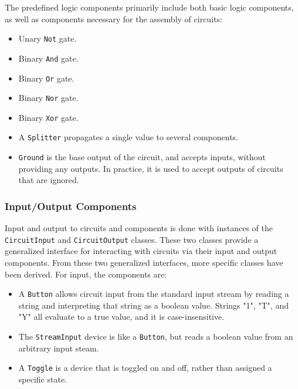 \documentclass{article}
\newcommand{\ClassName}[1]{\texttt{#1}}
\begin{document}
The predefined logic components primarily include both basic logic components, as well as components necessary for the assembly of circuits:

\begin{itemize}

\item Unary \ClassName{Not} gate.

\item Binary \ClassName{And} gate.

\item Binary \ClassName{Or} gate.

\item Binary \ClassName{Nor} gate.

\item Binary \ClassName{Xor} gate.

\item A \ClassName{Splitter} propagates a single value to several components.

\item \ClassName{Ground} is the base output of the circuit, and accepts inputs, without providing any outputs. In practice, it is used to accept outputs of circuits that are ignored.

\end{itemize}

\subsubsection{Input/Output Components}

Input and output to circuits and components is done with instances of the \ClassName{CircuitInput} and \ClassName{CircuitOutput} classes. These two classes provide a generalized interface for interacting with circuits via their input and output components. From these two generalized interfaces, more specific classes have been derived. For input, the components are:

\begin{itemize}

\item A \ClassName{Button} allows circuit input from the standard input stream by reading a string and interpreting that string as a boolean value. Strings "1", "T", and "Y" all evaluate to a true value, and it is case-insensitive.

\item The \ClassName{StreamInput} device is like a \ClassName{Button}, but reads a boolean value from an arbitrary input steam.

\item A \ClassName{Toggle} is a device that is toggled on and off, rather than assigned a specific state.

\end{itemize}
\end{document}
